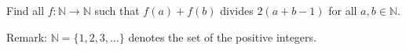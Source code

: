 Find all $f : \mathbb{N} \to \mathbb{N} $ such that $f(a) + f(b)$ divides $2(a + b - 1)$ for all $a, b \in \mathbb{N}$.

Remark: $\mathbb{N} = \{ 1, 2, 3, \ldots \} $ denotes the set of the positive integers.
